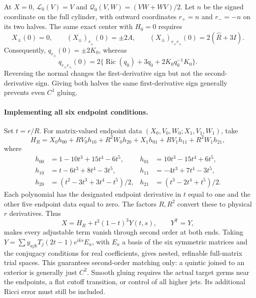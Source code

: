 \documentclass[a4paper,11pt]{article}
\numberwithin{equation}{section}
\theoremstyle{definition}
\newcommand{\Ric}{\operatorname{Ric}}
\begin{document}
At $X=0$, $\mathcal L_0(V)=V$ and $\mathcal Q_0(V,W)=(VW+WV)/2$.
Let $n$ be the signed coordinate on the full cylinder, with outward coordinates $r_+=n$ and $r_-=-n$ on its two halves.
The same exact center with $H_0=0$ requires
\begin{equation}\label{eq:matrix-center-jets}
 X_\pm(0)=0,\qquad (X_\pm)_{r_\pm}(0)=\pm2A,\qquad
 (X_\pm)_{r_\pm r_\pm}(0)=2(\widehat R+3I).
\end{equation}
Consequently, $q_{r_\pm}(0)=\pm2K_0$, whereas
\[
 q_{r_\pm r_\pm}(0)
 =2\{\Ric(q_0)+3q_0+2K_0q_0^{-1}K_0\}.
\]
Reversing the normal changes the first-derivative sign but not the second-derivative sign. Giving both halves the same first-derivative sign generally prevents even $C^1$ gluing.

\paragraph{Implementing all six endpoint conditions.}
Set $t=r/R$. For matrix-valued endpoint data $(X_0,V_0,W_0;X_1,V_1,W_1)$, take
\begin{equation}\label{eq:hermite-matrix}
 H_R=X_0h_{00}+RV_0h_{10}+R^2W_0h_{20}
       +X_1h_{01}+RV_1h_{11}+R^2W_1h_{21},
\end{equation}
where
\begin{align*}
 h_{00}&=1-10t^3+15t^4-6t^5,&h_{01}&=10t^3-15t^4+6t^5,\\
 h_{10}&=t-6t^3+8t^4-3t^5,&h_{11}&=-4t^3+7t^4-3t^5,\\
 h_{20}&=(t^2-3t^3+3t^4-t^5)/2,&h_{21}&=(t^3-2t^4+t^5)/2.
\end{align*}
Each polynomial has the designated endpoint derivative in $t$ equal to one and the other five endpoint data equal to zero.
The factors $R,R^2$ convert these to physical $r$ derivatives.
Thus
\begin{equation}\label{eq:hermite-free}
 X=H_R+t^3(1-t)^3Y(t,s),\qquad Y^{\mathsf T}=Y,
\end{equation}
makes every adjustable term vanish through second order at both ends. Taking
$Y=\sum y_{ajk}T_j(2t-1)e^{iks}E_a$, with $E_a$ a basis of the six symmetric matrices and the conjugacy conditions for real coefficients, gives nested, refinable full-matrix trial spaces.
This guarantees second-order matching only: a quintic joined to an exterior is generally just $C^2$.
Smooth gluing requires the actual target germs near the endpoints, a flat cutoff transition, or control of all higher jets. Its additional Ricci error must still be included.
\end{document}
